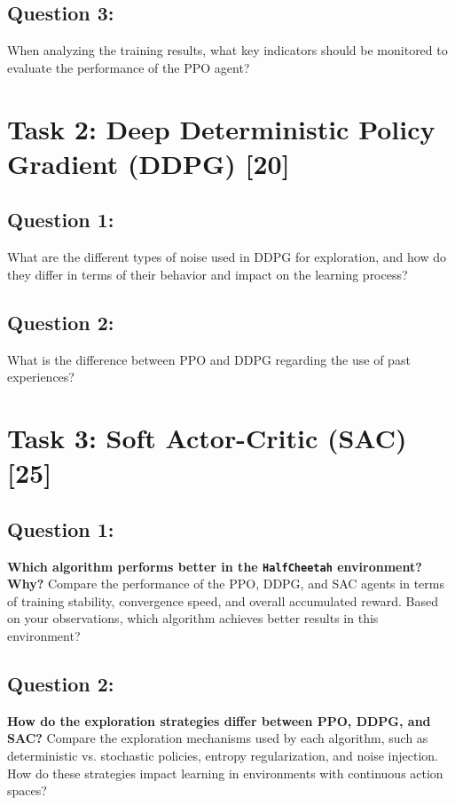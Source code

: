 \documentclass[12pt]{article}
\begin{document}
{{{\subsection{Question 3:} When analyzing the training results, what key indicators should be monitored to evaluate the performance of the PPO agent?



\newpage

\section{Task 2: Deep Deterministic Policy Gradient (DDPG) [20]}

\subsection{Question 1:}

What are the different types of noise used in DDPG for exploration, and how do they differ in terms of their behavior and impact on the learning process?

\vspace*{0.3cm}

\subsection{Question 2:}

What is the difference between PPO and DDPG regarding the use of past experiences?

\newpage

\section{Task 3: Soft Actor-Critic (SAC) [25]}

\subsection{Question 1:}
\textbf{Which algorithm performs better in the \texttt{HalfCheetah} environment? Why?}
\newline
Compare the performance of the PPO, DDPG, and SAC agents in terms of training stability, convergence speed, and overall accumulated reward. Based on your observations, which algorithm achieves better results in this environment?


\vspace*{0.3cm}

\subsection{Question 2:}
\textbf{How do the exploration strategies differ between PPO, DDPG, and SAC?}
\newline
Compare the exploration mechanisms used by each algorithm, such as deterministic vs. stochastic policies, entropy regularization, and noise injection. How do these strategies impact learning in environments with continuous action spaces?
\vspace*{0.3cm}

}}}
\end{document}
